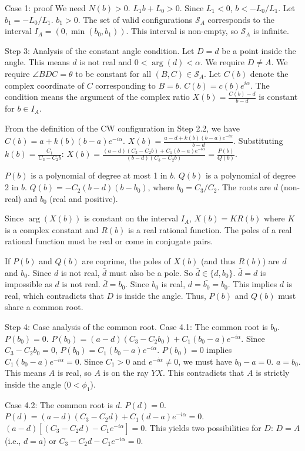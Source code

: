\documentclass{article} %
\begin{document}
\begin{promptbox}{Case 1: proof}
We need $N(b)>0$. $L_1 b + L_0 > 0$. Since $L_1<0$, $b < -L_0/L_1$.
Let $b_1 = -L_0/L_1$. $b_1>0$.
The set of valid configurations $\mathcal{S}_A$ corresponds to the interval $I_A = (0, \min(b_0, b_1))$. This interval is non-empty, so $\mathcal{S}_A$ is infinite.

Step 3: Analysis of the constant angle condition.
Let $D=d$ be a point inside the angle. This means $d$ is not real and $0 < \arg(d) < \alpha$. We require $D\ne A$.
We require $\angle BDC=\theta$ to be constant for all $(B, C) \in \mathcal{S}_A$.
Let $C(b)$ denote the complex coordinate of $C$ corresponding to $B=b$. $C(b)=c(b)e^{i\alpha}$.
The condition means the argument of the complex ratio $X(b) = \frac{C(b)-d}{b-d}$ is constant for $b\in I_A$.

From the definition of the CW configuration in Step 2.2, we have $C(b) = a + k(b)(b-a)e^{-i\alpha}$.
$X(b) = \frac{a-d+k(b)(b-a)e^{-i\alpha}}{b-d}$.
Substituting $k(b) = \frac{C_1}{C_3-C_2 b}$:
$X(b) = \frac{(a-d)(C_3-C_2 b) + C_1(b-a)e^{-i\alpha}}{(b-d)(C_3-C_2 b)} = \frac{P(b)}{Q(b)}$.

$P(b)$ is a polynomial of degree at most 1 in $b$. $Q(b)$ is a polynomial of degree 2 in $b$.
$Q(b) = -C_2(b-d)(b-b_0)$, where $b_0=C_3/C_2$. The roots are $d$ (non-real) and $b_0$ (real and positive).

Since $\arg(X(b))$ is constant on the interval $I_A$, $X(b) = K R(b)$ where $K$ is a complex constant and $R(b)$ is a real rational function.
The poles of a real rational function must be real or come in conjugate pairs.

If $P(b)$ and $Q(b)$ are coprime, the poles of $X(b)$ (and thus $R(b)$) are $d$ and $b_0$.
Since $d$ is not real, $\bar{d}$ must also be a pole.
So $\bar{d} \in \{d, b_0\}$.
$\bar{d}=d$ is impossible as $d$ is not real.
$\bar{d}=b_0$. Since $b_0$ is real, $d=\bar{b_0}=b_0$. This implies $d$ is real, which contradicts that $D$ is inside the angle.
Thus, $P(b)$ and $Q(b)$ must share a common root.

Step 4: Case analysis of the common root.
Case 4.1: The common root is $b_0$. $P(b_0)=0$.
$P(b_0) = (a-d)(C_3-C_2 b_0) + C_1(b_0-a)e^{-i\alpha}$.
Since $C_3-C_2 b_0=0$, $P(b_0) = C_1(b_0-a)e^{-i\alpha}$.
$P(b_0)=0$ implies $C_1(b_0-a)e^{-i\alpha}=0$.
Since $C_1>0$ and $e^{-i\alpha}\ne 0$, we must have $b_0-a=0$. $a=b_0$.
This means $A$ is real, so $A$ is on the ray $YX$. This contradicts that $A$ is strictly inside the angle ($0<\phi_1$).

Case 4.2: The common root is $d$. $P(d)=0$.
$P(d) = (a-d)(C_3-C_2 d) + C_1(d-a)e^{-i\alpha} = 0$.
$(a-d) [ (C_3-C_2 d) - C_1 e^{-i\alpha} ] = 0$.
This yields two possibilities for $D$: $D=A$ (i.e., $d=a$) or $C_3-C_2 d - C_1 e^{-i\alpha} = 0$.


\end{promptbox}
\end{document}
